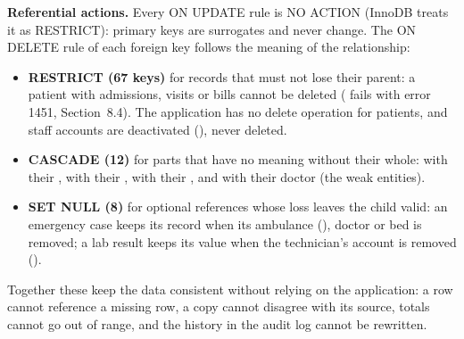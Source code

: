 \textbf{Referential actions.} Every ON UPDATE rule is NO ACTION (InnoDB treats it as RESTRICT): primary keys are
surrogates and never change. The ON DELETE rule of each foreign key follows the meaning of the relationship:
\begin{itemize}
\item \textbf{RESTRICT (67 keys)} for records that must not lose their parent: a patient with admissions, visits or
bills cannot be deleted ( fails with error 1451, Section~8.4).
The application has no delete operation for patients, and staff accounts are deactivated (), never deleted.
\item \textbf{CASCADE (12)} for parts that have no meaning without their whole:  with their
,  with their ,  with their
,  and  with their doctor (the weak entities).
\item \textbf{SET NULL (8)} for optional references whose loss leaves the child valid: an emergency case keeps its
record when its ambulance (), doctor or bed is removed; a lab result keeps its value when the
technician's account is removed ().
\end{itemize}
Together these keep the data consistent without relying on the application: a row cannot reference a missing row,
a copy cannot disagree with its source, totals cannot go out of range, and the history in the audit log cannot be
rewritten.
